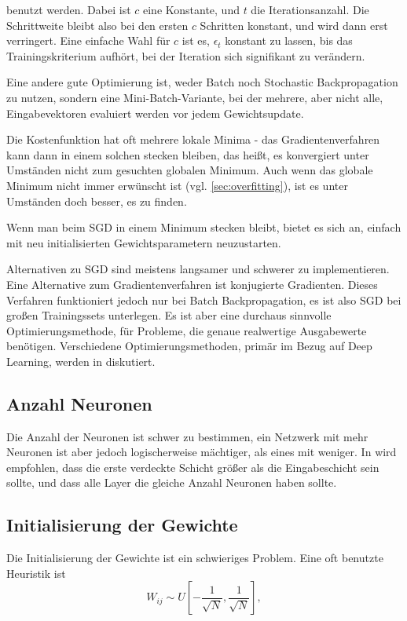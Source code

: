 benutzt werden. Dabei ist $c$ eine Konstante, und $t$ die Iterationsanzahl. Die Schrittweite bleibt also bei den ersten $c$ Schritten konstant, und wird dann erst verringert. Eine einfache Wahl für $c$ ist es, $\epsilon_t$ konstant zu lassen, bis das Trainingskriterium aufhört, bei der Iteration sich signifikant zu verändern.

Eine andere gute Optimierung ist, weder Batch noch Stochastic Backpropagation zu nutzen, sondern eine Mini-Batch-Variante, bei der mehrere, aber nicht alle, Eingabevektoren evaluiert werden vor jedem Gewichtsupdate. 

Die Kostenfunktion hat oft mehrere lokale Minima - das Gradientenverfahren kann dann in einem solchen stecken bleiben, das heißt, es konvergiert unter Umständen nicht zum gesuchten globalen Minimum. Auch wenn das globale Minimum nicht immer erwünscht ist (vgl. \ref{sec:overfitting}), ist es unter Umständen doch besser, es zu finden.

Wenn man beim SGD in einem Minimum stecken bleibt, bietet es sich an, einfach mit neu initialisierten Gewichtsparametern neuzustarten. 

Alternativen zu SGD sind meistens langsamer und schwerer zu implementieren. Eine Alternative zum Gradientenverfahren ist konjugierte Gradienten. Dieses Verfahren funktioniert jedoch nur bei Batch Backpropagation, es ist also SGD bei großen Trainingssets unterlegen. Es ist aber eine durchaus sinnvolle Optimierungsmethode, für Probleme, die genaue realwertige Ausgabewerte benötigen\cite{lecunefficient}.
Verschiedene Optimierungsmethoden, primär im Bezug auf Deep Learning, werden in \cite{ngiam2011optimization} diskutiert.

\subsection{Anzahl Neuronen}
Die Anzahl der Neuronen ist schwer zu bestimmen, ein Netzwerk mit mehr Neuronen ist aber jedoch logischerweise mächtiger, als eines mit weniger. In \cite{bengio2012practical} wird empfohlen, dass die erste verdeckte Schicht größer als die Eingabeschicht sein sollte, und dass alle Layer die gleiche Anzahl Neuronen haben sollte.

\subsection{Initialisierung der Gewichte}
Die Initialisierung der Gewichte ist ein schwieriges Problem. Eine oft benutzte Heuristik ist 
\begin{equation}
	W_{ij} \sim U [ -\frac{1}{\sqrt{N}} , \frac{1}{\sqrt{N}} ],
\end{equation}

